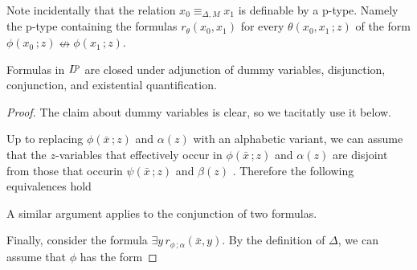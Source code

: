 
Note incidentally that the relation $x_0\equiv_{\Delta,M} x_1$ is definable by a p-type.
Namely the p-type containing the formulas $r_{\theta}(x_0,x_1)$ for every $\theta(x_0,x_1\,;z)$ of the form $\phi(x_0\,;z)\nleftrightarrow\phi(x_1\,;z)$.

\begin{fact}\label{fact_p_qe}
  Formulas in $L^{\rm\! p}$ are closed under adjunction of dummy variables, disjunction, conjunction, and existential quantification.
\end{fact}

\begin{proof}
  The claim about dummy variables is clear, so we tacitatly use it below.

  Up to replacing $\phi(\bar x\,;z)$  and $\alpha(z)$ with an alphabetic variant, we can assume that the $z$-variables that effectively occur in $\phi(\bar x\,;z)$ and $\alpha(z)$ are disjoint from those that occurin $\psi(\bar x\,;z)$ and $\beta(z)$ .
  Therefore the following equivalences hold 


  

  



  A similar argument applies to the conjunction of two formulas.

  Finally, consider the formula $\exists y\,r_{\phi\,;\alpha}(\bar x,y)$.
  By the definition of $\Delta$, we can assume that $\phi$ has the form



\end{proof}
